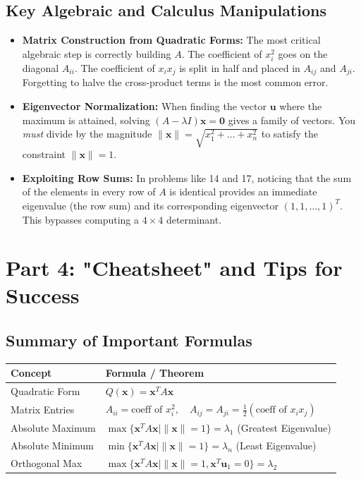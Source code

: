 \documentclass[11pt, letterpaper]{article}
\theoremstyle{definition}
\theoremstyle{remark}
\begin{document}
\subsection{Key Algebraic and Calculus Manipulations}
\begin{itemize}
    \item \textbf{Matrix Construction from Quadratic Forms:} The most critical algebraic step is correctly building $A$. The coefficient of $x_i^2$ goes on the diagonal $A_{ii}$. The coefficient of $x_i x_j$ is split in half and placed in $A_{ij}$ and $A_{ji}$. Forgetting to halve the cross-product terms is the most common error.
    \item \textbf{Eigenvector Normalization:} When finding the vector $\mathbf{u}$ where the maximum is attained, solving $(A - \lambda I)\mathbf{x} = \mathbf{0}$ gives a family of vectors. You \textit{must} divide by the magnitude $\|\mathbf{x}\| = \sqrt{x_1^2 + \dots + x_n^2}$ to satisfy the constraint $\|\mathbf{x}\| = 1$.
    \item \textbf{Exploiting Row Sums:} In problems like 14 and 17, noticing that the sum of the elements in every row of $A$ is identical provides an immediate eigenvalue (the row sum) and its corresponding eigenvector $(1, 1, \dots, 1)^T$. This bypasses computing a $4 \times 4$ determinant.
\end{itemize}

\newpage

\section{Part 4: "Cheatsheet" and Tips for Success}

\subsection{Summary of Important Formulas}
\renewcommand{\arraystretch}{1.5}
\begin{tabularx}{\textwidth}{l X}
\toprule
\textbf{Concept} & \textbf{Formula / Theorem} \\
\midrule
Quadratic Form & $Q(\mathbf{x}) = \mathbf{x}^T A \mathbf{x}$ \\
Matrix Entries & $A_{ii} = \text{coeff of } x_i^2, \quad A_{ij} = A_{ji} = \frac{1}{2}(\text{coeff of } x_i x_j)$ \\
Absolute Maximum & $\max \{ \mathbf{x}^T A \mathbf{x} \mid \|\mathbf{x}\| = 1 \} = \lambda_1$ (Greatest Eigenvalue) \\
Absolute Minimum & $\min \{ \mathbf{x}^T A \mathbf{x} \mid \|\mathbf{x}\| = 1 \} = \lambda_n$ (Least Eigenvalue) \\
Orthogonal Max & $\max \{ \mathbf{x}^T A \mathbf{x} \mid \|\mathbf{x}\| = 1, \mathbf{x}^T\mathbf{u}_1 = 0 \} = \lambda_2$ \\
\bottomrule
\end{tabularx}
\end{document}

